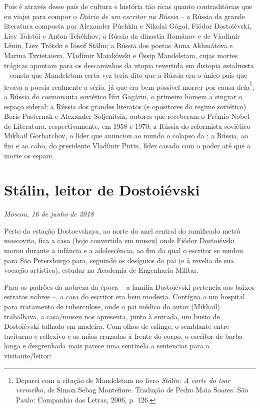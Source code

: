 Pois é através desse país de cultura e história tão ricas quanto
contraditórias que eu viajei para compor o \emph{Diário de um escritor
na Rússia} -- a Rússia da grande literatura composta por Alexander
Púchkin e Nikolai Gógol, Fiódor Dostoiévski, Liev Tolstói e Anton
Tchékhov; a Rússia da dinastia Románov e de Vladímir Lênin, Liev Trótski
e Ióssif Stálin; a Rússia dos poetas Anna Akhmátova e Marina
Tzvietaieva, Vladímir Maiakóvski e Óssip Mandelstam, cujas mortes
trágicas apontam para os descaminhos da utopia revertida em distopia
estalinista -- consta que Mandelstam certa vez teria dito que a Rússia
era o único país que levava a poesia realmente a sério, já que era bem
possível morrer por causa dela\footnote{Deparei com a citação de
  Mandelstam no livro \emph{Stálin: A corte do tsar vermelho}, de Simon
  Sebag Montefiore. Tradução de Pedro Maia Soares. São Paulo: Companhia
  das Letras, 2006, p. 126.}; a Rússia do cosmonauta soviético Iúri
Gagárin, o primeiro homem a singrar o espaço sideral; a Rússia dos
grandes literatos (e opositores do regime soviético) Boris Pasternak e
Alexander Soljenítsin, autores que receberam o Prêmio Nobel de
Literatura, respectivamente, em 1958 e 1970; a Rússia do reformista
soviético Mikhail Gorbatchov, o líder que anunciou ao mundo o colapso da
; a Rússia, ao fim e ao cabo, do presidente Vladímir Putin, líder
casado com o poder até que a morte os separe.

\chapter*{Stálin, leitor de Dostoiévski}

\begin{flushright}
\emph{Moscou, 16 de junho de 2018}
\end{flushright}

Perto da estação Dostoevskaya, ao norte do anel central do ramificado
metrô moscovita, fica a casa (hoje convertida em museu) onde Fiódor
Dostoiévski morou durante a infância e a adolescência, ao fim da qual o
escritor se mudou para São Petersburgo para, seguindo os desígnios do
pai (e à revelia de sua vocação artística), estudar na Academia de
Engenharia Militar.

Para os padrões da nobreza da época -- a família Dostoiévski pertencia
aos baixos estratos nobres --, a casa do escritor era bem modesta.
Contígua a um hospital para tratamento de tuberculose, onde o pai médico
do autor (Mikhail) trabalhava, a casa/museu nos apresenta, junto à
entrada, um busto de Dostoiévski talhado em madeira. Com olhos de
esfinge, o semblante entre taciturno e reflexivo e as mãos cruzadas à
frente do corpo, o escritor de barba longa e desgrenhada mais parece uma
sentinela a sentenciar para o visitante/leitor:

